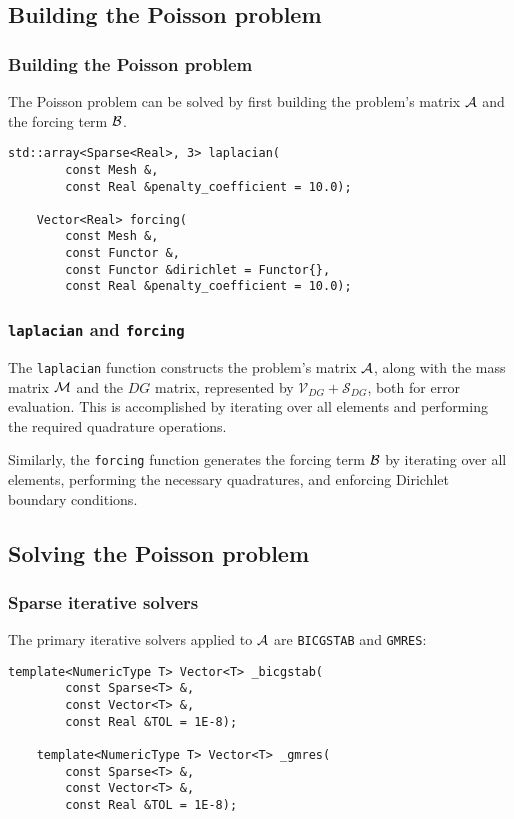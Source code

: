 \subsection{Building the Poisson problem}

\begin{frame}[fragile]
    \frametitle{Building the Poisson problem}

    The Poisson problem can be solved by first building the problem's matrix $\mathcal{A}$ and the forcing term $\mathcal{B}$.

    \begin{lstlisting}[style=cpp]
    std::array<Sparse<Real>, 3> laplacian(
        const Mesh &, 
        const Real &penalty_coefficient = 10.0);
    
    Vector<Real> forcing(
        const Mesh &, 
        const Functor &, 
        const Functor &dirichlet = Functor{}, 
        const Real &penalty_coefficient = 10.0);
    \end{lstlisting}
\end{frame}

\begin{frame}[fragile]
    \frametitle{\lstinline{laplacian} and \lstinline{forcing}}

    The \lstinline{laplacian} function constructs the problem's matrix $\mathcal{A}$, along with the mass matrix $\mathcal{M}$ and the $DG$ matrix, represented by $\mathcal{V}_{DG} + \mathcal{S}_{DG}$, both for error evaluation. This is accomplished by iterating over all elements and performing the required quadrature operations.

    Similarly, the \lstinline{forcing} function generates the forcing term $\mathcal{B}$ by iterating over all elements, performing the necessary quadratures, and enforcing Dirichlet boundary conditions.
\end{frame}

\subsection{Solving the Poisson problem}

\begin{frame}[fragile]
    \frametitle{Sparse iterative solvers}

    The primary iterative solvers applied to $\mathcal{A}$ are \lstinline{BICGSTAB} and \lstinline{GMRES}:

    \begin{lstlisting}[style=cpp]
    template<NumericType T> Vector<T> _bicgstab(
        const Sparse<T> &, 
        const Vector<T> &, 
        const Real &TOL = 1E-8);
    
    template<NumericType T> Vector<T> _gmres(
        const Sparse<T> &, 
        const Vector<T> &, 
        const Real &TOL = 1E-8);
    \end{lstlisting}
\end{frame}

